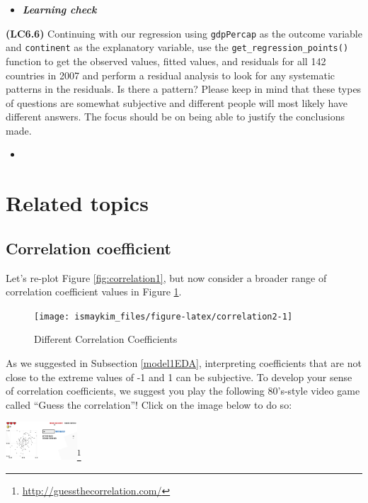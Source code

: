 \documentclass[12pt,]{krantz}
\renewcommand{\href}[2]{#2\footnote{\url{#1}}}
\newenvironment{rmdblock}[1]
  {\begin{shaded*}
  \begin{itemize}
  \renewcommand{\labelitemi}{
    \raisebox{-.7\height}[0pt][0pt]{
    }
  }
  \item
  }
  {
  \end{itemize}
  \end{shaded*}
  }
\newenvironment{learncheck}
  {\begin{rmdblock}{warning}}
  {\end{rmdblock}}
\begin{document}
\begin{learncheck}
\textbf{\emph{Learning check}}
\end{learncheck}

\textbf{(LC6.6)} Continuing with our regression using \texttt{gdpPercap}
as the outcome variable and \texttt{continent} as the explanatory
variable, use the \texttt{get\_regression\_points()} function to get the
observed values, fitted values, and residuals for all 142 countries in
2007 and perform a residual analysis to look for any systematic patterns
in the residuals. Is there a pattern? Please keep in mind that these
types of questions are somewhat subjective and different people will
most likely have different answers. The focus should be on being able to
justify the conclusions made.

\begin{learncheck}

\end{learncheck}

\section{Related topics}\label{related-topics}

\subsection{Correlation coefficient}\label{correlationcoefficient}

Let's re-plot Figure \ref{fig:correlation1}, but now consider a broader
range of correlation coefficient values in Figure
\ref{fig:correlation2}.

\begin{figure}

{\centering \texttt{[image: ismaykim\_files/figure-latex/correlation2-1]} 

}

\caption{Different Correlation Coefficients}\label{fig:correlation2}
\end{figure}

As we suggested in Subsection \ref{model1EDA}, interpreting coefficients
that are not close to the extreme values of -1 and 1 can be subjective.
To develop your sense of correlation coefficients, we suggest you play
the following 80's-style video game called ``Guess the correlation''!
Click on the image below to do so:

\begin{center}
\href{http://guessthecorrelation.com/}{\includegraphics[width=0.2\textwidth]{images/guess_the_correlation.png}}
\end{center}
\end{document}

